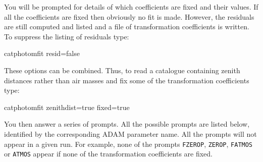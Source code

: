 \documentclass[twoside,11pt]{starlink}
\begin{document}
You will be prompted for details of which coefficients are fixed and
their values.  If all the coefficients are fixed then obviously no fit
is made.  However, the residuals are still computed and listed and a
file of transformation coefficients is written.  To suppress the listing
of residuals type:

\begin{terminalv}
catphotomfit  resid=false
\end{terminalv}

These options can be combined.  Thus, to read a catalogue containing
zenith distances rather than air masses and fix some of the
transformation coefficients type:

\begin{terminalv}
catphotomfit  zenithdist=true  fixed=true
\end{terminalv}

You then answer a series of prompts.  All the possible prompts are
listed below, identified by the corresponding ADAM parameter name.  All
the prompts will not appear in a given run.  For example, none of
the prompts \texttt{FZEROP}, \texttt{ZEROP}, \texttt{FATMOS} or \texttt{ATMOS}
appear if none of the transformation coefficients are fixed.
\end{document}
